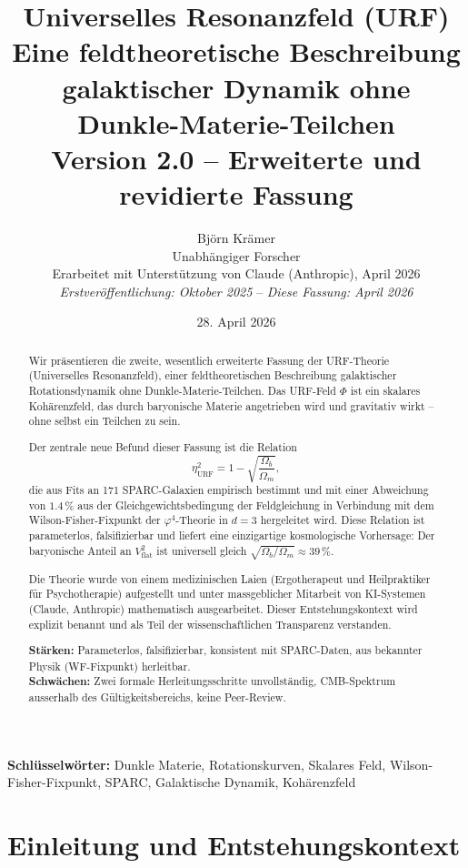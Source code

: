 \documentclass[12pt,a4paper]{article}
\title{
{\LARGE\bfseries Universelles Resonanzfeld (URF)}\\[0.5em]
{\large Eine feldtheoretische Beschreibung galaktischer Dynamik ohne Dunkle-Materie-Teilchen}\\[1em]
{\normalsize Version 2.0 -- Erweiterte und revidierte Fassung}
}
\author{Björn Krämer\\
\small Unabhängiger Forscher\\
\small Erarbeitet mit Unterstützung von Claude (Anthropic), April 2026\\[0.3em]
\small \textit{Erstveröffentlichung: Oktober 2025} -- \textit{Diese Fassung: April 2026}
}
\date{28. April 2026}
\newcommand{\etaURF}{\eta_{\mathrm{URF}}}
\theoremstyle{definition}
\begin{document}
\maketitle
\thispagestyle{empty}

\begin{abstract}
\noindent
Wir präsentieren die zweite, wesentlich erweiterte Fassung der URF-Theorie
(Universelles Resonanzfeld), einer feldtheoretischen Beschreibung galaktischer
Rotationsdynamik ohne Dunkle-Materie-Teilchen. Das URF-Feld $\Phi$ ist ein
skalares Kohärenzfeld, das durch baryonische Materie angetrieben wird und
gravitativ wirkt -- ohne selbst ein Teilchen zu sein.

Der zentrale neue Befund dieser Fassung ist die Relation
\begin{equation}
\etaURF^2 = 1 - \sqrt{\frac{\Omega_b}{\Omega_m}},
\end{equation}
die aus Fits an 171 SPARC-Galaxien empirisch bestimmt und mit einer
Abweichung von $1.4\,\%$ aus der Gleichgewichtsbedingung der Feldgleichung
in Verbindung mit dem Wilson-Fisher-Fixpunkt der $\varphi^4$-Theorie in
$d=3$ hergeleitet wird. Diese Relation ist parameterlos, falsifizierbar und
liefert eine einzigartige kosmologische Vorhersage: Der baryonische Anteil
an $V_{\mathrm{flat}}^2$ ist universell gleich $\sqrt{\Omega_b/\Omega_m} \approx 39\,\%$.

Die Theorie wurde von einem medizinischen Laien (Ergotherapeut und
Heilpraktiker für Psychotherapie) aufgestellt und unter massgeblicher
Mitarbeit von KI-Systemen (Claude, Anthropic) mathematisch ausgearbeitet.
Dieser Entstehungskontext wird explizit benannt und als Teil der
wissenschaftlichen Transparenz verstanden.

\noindent\textbf{Stärken:} Parameterlos, falsifizierbar, konsistent mit SPARC-Daten,
aus bekannter Physik (WF-Fixpunkt) herleitbar.\\
\textbf{Schwächen:} Zwei formale Herleitungsschritte unvollständig,
CMB-Spektrum ausserhalb des Gültigkeitsbereichs, keine Peer-Review.
\end{abstract}

\vspace{1em}
\noindent\textbf{Schlüsselwörter:} Dunkle Materie, Rotationskurven,
Skalares Feld, Wilson-Fisher-Fixpunkt, SPARC, Galaktische Dynamik, Kohärenzfeld

\newpage
\tableofcontents
\newpage

\section{Einleitung und Entstehungskontext}
\label{sec:einleitung}
\end{document}
